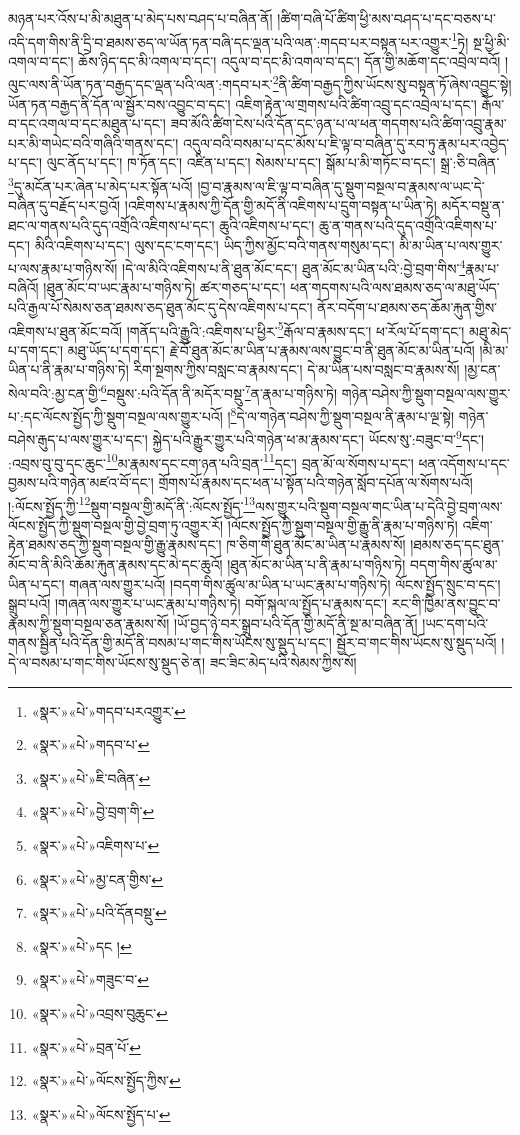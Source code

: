 མཉན་པར་འོས་པ་མི་མཐུན་པ་མེད་པས་བཤད་པ་བཞིན་ནོ། །ཚིག་བཞི་པོ་ཚིག་ཕྱི་མས་བཤད་པ་དང་བཅས་པ་འདི་དག་གིས་ནི་དྲི་བ་ཐམས་ཅད་ལ་ཡོན་ཏན་བཞི་དང་ལྡན་པའི་ལན་:གདབ་པར་བསྟན་པར་འགྱུར་\footnote{«སྣར་»«པེ་»གདབ་པརའགྱུར་}ཏེ། སྔ་ཕྱི་མི་འགལ་བ་དང་། ཆོས་ཉིད་དང་མི་འགལ་བ་དང་། འདུལ་བ་དང་མི་འགལ་བ་དང་། དོན་གྱི་མཆོག་དང་འབྲེལ་བའོ། །ལུང་ལས་ནི་ཡོན་ཏན་བརྒྱད་དང་ལྡན་པའི་ལན་:གདབ་པར་\footnote{«སྣར་»«པེ་»གདབ་པ་}ནི་ཚིག་བརྒྱད་ཀྱིས་ཡོངས་སུ་བསྟན་ཏོ་ཞེས་འབྱུང་སྟེ། ཡོན་ཏན་བརྒྱད་ནི་དོན་ལ་སྦྱོར་བས་འབྱུང་བ་དང་། འཇིག་རྟེན་ལ་གྲགས་པའི་ཚིག་འབྲུ་དང་འབྲེལ་པ་དང་། རྒོལ་བ་དང་འགལ་བ་དང་མཐུན་པ་དང་། ཟབ་མོའི་ཚིག་ངེས་པའི་དོན་དང་ཉན་པ་ལ་ཕན་གདགས་པའི་ཚིག་འབྲུ་རྣམ་པར་མི་གཡེང་བའི་གཞིའི་གནས་དང་། འདུལ་བའི་བསམ་པ་དང་མོས་པ་ཇི་ལྟ་བ་བཞིན་དུ་རབ་ཏུ་རྣམ་པར་འབྱེད་པ་དང་། ལུང་ནོད་པ་དང་། ཁ་ཏོན་དང་། འཛིན་པ་དང་། སེམས་པ་དང་། སྒོམ་པ་མི་གཏོང་བ་དང་། སྒྲ་:ཅི་བཞིན་\footnote{«སྣར་»«པེ་»ཇི་བཞིན་}དུ་མངོན་པར་ཞེན་པ་མེད་པར་སྟོན་པའོ། །བྱ་བ་རྣམས་ལ་ཇི་ལྟ་བ་བཞིན་དུ་སྡུག་བསྔལ་བ་རྣམས་ལ་ཡང་དེ་བཞིན་དུ་བརྗོད་པར་བྱའོ། །འཇིགས་པ་རྣམས་ཀྱི་དོན་གྱི་མདོ་ནི་འཇིགས་པ་དྲུག་བསྟན་པ་ཡིན་ཏེ། མདོར་བསྡུ་ན་ཐང་ལ་གནས་པའི་དུད་འགྲོའི་འཇིགས་པ་དང་། ཆུའི་འཇིགས་པ་དང་། ཆུ་ན་གནས་པའི་དུད་འགྲོའི་འཇིགས་པ་དང་། མིའི་འཇིགས་པ་དང་། ལུས་དང་ངག་དང་། ཡིད་ཀྱིས་མྱོང་བའི་གནས་གསུམ་དང་། མི་མ་ཡིན་པ་ལས་གྱུར་པ་ལས་རྣམ་པ་གཉིས་སོ། །དེ་ལ་མིའི་འཇིགས་པ་ནི་ཐུན་མོང་དང་། ཐུན་མོང་མ་ཡིན་པའི་:བྱེ་བྲག་གིས་\footnote{«སྣར་»«པེ་»བྱེ་བྲག་གི་}རྣམ་པ་བཞིའོ། །ཐུན་མོང་བ་ཡང་རྣམ་པ་གཉིས་ཏེ། ཚར་གཅད་པ་དང་། ཕན་གདགས་པའི་ལས་ཐམས་ཅད་ལ་མཐུ་ཡོད་པའི་རྒྱལ་པོ་སེམས་ཅན་ཐམས་ཅད་ཐུན་མོང་དུ་དེས་འཇིགས་པ་དང་། ནོར་བདོག་པ་ཐམས་ཅད་ཆོམ་རྐུན་གྱིས་འཇིགས་པ་ཐུན་མོང་བའོ། །གནོད་པའི་རྒྱུའི་:འཇིགས་པ་ཕྱིར་\footnote{«སྣར་»«པེ་»འཇིགས་པ་}རྒོལ་བ་རྣམས་དང་། ཕ་རོལ་པོ་དག་དང་། མཐུ་མེད་པ་དག་དང་། མཐུ་ཡོད་པ་དག་དང་། རྗེ་བོ་ཐུན་མོང་མ་ཡིན་པ་རྣམས་ལས་བྱུང་བ་ནི་ཐུན་མོང་མ་ཡིན་པའོ། །མི་མ་ཡིན་པ་ནི་རྣམ་པ་གཉིས་ཏེ། རིག་སྔགས་ཀྱིས་བསླང་བ་རྣམས་དང་། དེ་མ་ཡིན་པས་བསླང་བ་རྣམས་སོ། །མྱ་ངན་སེལ་བའི་:མྱ་ངན་གྱི་\footnote{«སྣར་»«པེ་»མྱ་ངན་གྱིས་}བསྡུས་:པའི་དོན་ནི་མདོར་བསྡུ་\footnote{«སྣར་»«པེ་»པའི་དོནབསྡུ་}ན་རྣམ་པ་གཉིས་ཏེ། གཉེན་བཤེས་ཀྱི་སྡུག་བསྔལ་ལས་གྱུར་པ་:དང་ལོངས་སྤྱོད་ཀྱི་སྡུག་བསྔལ་ལས་གྱུར་པའོ། །\footnote{«སྣར་»«པེ་»དང །}དེ་ལ་གཉེན་བཤེས་ཀྱི་སྡུག་བསྔལ་ནི་རྣམ་པ་ལྔ་སྟེ། གཉེན་བཤེས་རྒུད་པ་ལས་གྱུར་པ་དང་། སྐྱེད་པའི་རྒྱུར་གྱུར་པའི་གཉེན་ཕ་མ་རྣམས་དང་། ཡོངས་སུ་:བཟུང་བ་\footnote{«སྣར་»«པེ་»གཟུང་བ་}དང་། :འབྲས་བུ་བུ་དང་ཆུང་\footnote{«སྣར་»«པེ་»འབྲས་བུཆུང་}མ་རྣམས་དང་ངག་ཉན་པའི་བྲན་\footnote{«སྣར་»«པེ་»བྲན་པོ་}དང་། བྲན་མོ་ལ་སོགས་པ་དང་། ཕན་འདོགས་པ་དང་བྱམས་པའི་གཉེན་མཛའ་བོ་དང་། གྲོགས་པོ་རྣམས་དང་ཕན་པ་སྟོན་པའི་གཉེན་སློབ་དཔོན་ལ་སོགས་པའོ། །:ལོངས་སྤྱོད་ཀྱི་\footnote{«སྣར་»«པེ་»ལོངས་སྤྱོད་ཀྱིས་}སྡུག་བསྔལ་གྱི་མདོ་ནི་:ལོངས་སྤྱོད་\footnote{«སྣར་»«པེ་»ལོངས་སྤྱོད་པ་}ལས་གྱུར་པའི་སྡུག་བསྔལ་གང་ཡིན་པ་དེའི་བྱེ་བྲག་ལས་ལོངས་སྤྱོད་ཀྱི་སྡུག་བསྔལ་གྱི་བྱེ་བྲག་ཏུ་འགྱུར་རོ། །ལོངས་སྤྱོད་ཀྱི་སྡུག་བསྔལ་གྱི་རྒྱུ་ནི་རྣམ་པ་གཉིས་ཏེ། འཇིག་རྟེན་ཐམས་ཅད་ཀྱི་སྡུག་བསྔལ་གྱི་རྒྱུ་རྣམས་དང་། ཁ་ཅིག་གི་ཐུན་མོང་མ་ཡིན་པ་རྣམས་སོ། །ཐམས་ཅད་དང་ཐུན་མོང་བ་ནི་མིའི་ཆོམ་རྐུན་རྣམས་དང་མེ་དང་ཆུའོ། །ཐུན་མོང་མ་ཡིན་པ་ནི་རྣམ་པ་གཉིས་ཏེ། བདག་གིས་ཚུལ་མ་ཡིན་པ་དང་། གཞན་ལས་གྱུར་པའོ། །བདག་གིས་ཚུལ་མ་ཡིན་པ་ཡང་རྣམ་པ་གཉིས་ཏེ། ལོངས་སྤྱོད་སྲུང་བ་དང་། སྒྲུབ་པའོ། །གཞན་ལས་གྱུར་པ་ཡང་རྣམ་པ་གཉིས་ཏེ། བགོ་སྐལ་ལ་སྤྱོད་པ་རྣམས་དང་། རང་གི་ཁྱིམ་ནས་བྱུང་བ་རྣམས་ཀྱི་སྡུག་བསྔལ་ཅན་རྣམས་སོ། །ཡོ་བྱད་ཉེ་བར་སྒྲུབ་པའི་དོན་གྱི་མདོ་ནི་སྔ་མ་བཞིན་ནོ། །ཡང་དག་པའི་གནས་སྦྱིན་པའི་དོན་གྱི་མདོ་ནི་བསམ་པ་གང་གིས་ཡོངས་སུ་སྡུད་པ་དང་། སྦྱོར་བ་གང་གིས་ཡོངས་སུ་སྡུད་པའོ། །དེ་ལ་བསམ་པ་གང་གིས་ཡོངས་སུ་སྡུད་ཅེ་ན། ཟང་ཟིང་མེད་པའི་སེམས་ཀྱིས་སོ། 